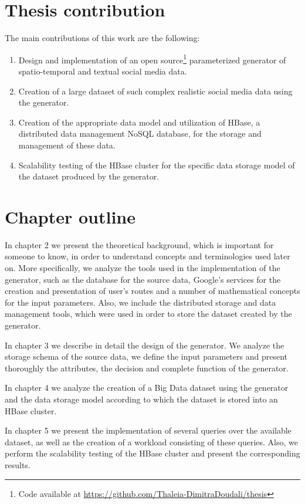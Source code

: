 \section{Thesis contribution}

The main contributions of this work are the following:

\begin{enumerate}
  \item Design and implementation of an open source\footnote{Code available at \url{https://github.com/Thaleia-DimitraDoudali/thesis}} parameterized 
  generator of spatio-temporal and textual social media data. 
  \item Creation of a large dataset of such complex realistic social media data using the generator.
  \item Creation of the appropriate data model and utilization of HBase, a distributed data management NoSQL database, for the storage and management of these data.  
  \item Scalability testing of the HBase cluster for the specific data storage model of the dataset produced by the generator.
\end{enumerate}

\section{Chapter outline}

In chapter 2 we present the theoretical background, which is important for someone to know, in order to understand concepts and terminologies used later on. 
More specifically, we analyze the tools used in the implementation of the generator, such as the database for the source data,
Google's services for the creation and presentation of user's routes and a number of mathematical concepts for the input parameters. Also,
we include the distributed storage and data management tools, which were used in order to store the dataset created by the generator. 

In chapter 3 we describe in detail the design of the generator. We analyze the storage schema of the source data, we define the input parameters and 
present thoroughly the attributes, the decision and complete function of the generator. 

In chapter 4 we analyze the creation of a Big Data dataset using the generator and the data storage model according to which the dataset is stored into an 
HBase cluster.

In chapter 5 we present the implementation of several queries over the available dataset, as well as the creation of a workload consisting of these queries. Also, 
we perform the scalability testing of the HBase cluster and present the corresponding results.

